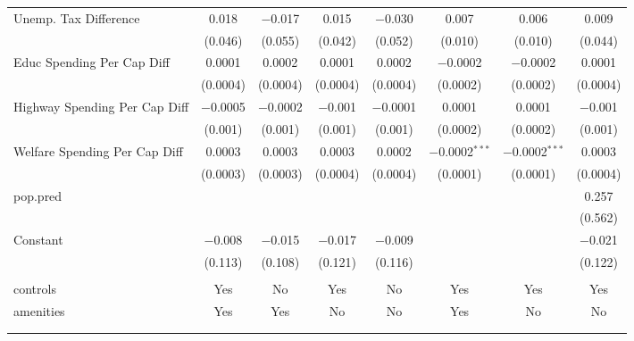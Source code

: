 \begin{table}[!htbp]
\begin{tabular}{@{\extracolsep{5pt}}lccccccc}
  Unemp. Tax Difference & 0.018 & $-$0.017 & 0.015 & $-$0.030 & 0.007 & 0.006 & 0.009 \\ 
  & (0.046) & (0.055) & (0.042) & (0.052) & (0.010) & (0.010) & (0.044) \\ 
  Educ Spending Per Cap Diff & 0.0001 & 0.0002 & 0.0001 & 0.0002 & $-$0.0002 & $-$0.0002 & 0.0001 \\ 
  & (0.0004) & (0.0004) & (0.0004) & (0.0004) & (0.0002) & (0.0002) & (0.0004) \\ 
  Highway Spending Per Cap Diff & $-$0.0005 & $-$0.0002 & $-$0.001 & $-$0.0001 & 0.0001 & 0.0001 & $-$0.001 \\ 
  & (0.001) & (0.001) & (0.001) & (0.001) & (0.0002) & (0.0002) & (0.001) \\ 
  Welfare Spending Per Cap Diff & 0.0003 & 0.0003 & 0.0003 & 0.0002 & $-$0.0002$^{***}$ & $-$0.0002$^{***}$ & 0.0003 \\ 
  & (0.0003) & (0.0003) & (0.0004) & (0.0004) & (0.0001) & (0.0001) & (0.0004) \\ 
  pop.pred &  &  &  &  &  &  & 0.257 \\ 
  &  &  &  &  &  &  & (0.562) \\ 
  Constant & $-$0.008 & $-$0.015 & $-$0.017 & $-$0.009 &  &  & $-$0.021 \\ 
  & (0.113) & (0.108) & (0.121) & (0.116) &  &  & (0.122) \\ 
 \hline \\[-1.8ex] 
controls & Yes & No & Yes & No & Yes & Yes & Yes \\ 
amenities & Yes & Yes & No & No & Yes & No & No \\ 
\hline \\[-1.8ex] 
\hline 
\hline \\[-1.8ex] 
\end{tabular} 
\end{table} 
